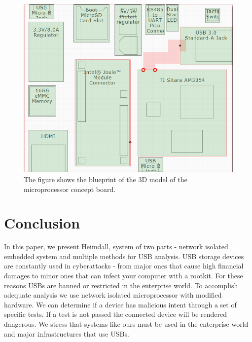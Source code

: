 \documentclass[sigconf]{acmart}
\begin{document}
\begin{figure}[htp]
    \centering
    \includegraphics[width=\linewidth]{images/Screenshot_2D.png}
    \caption{The figure shows the blueprint of the 3D model of the microprocessor concept board.}
    \label{fig:scheme}
\end{figure}

\section{Conclusion}
\quad In this paper, we present Heimdall, system of two parts - network isolated embedded system and multiple methods for USB analysis. USB storage devices are constantly used in cyberattacks - from major ones that cause high financial damages to minor ones that can infect your computer with a rootkit. For these reasons USBs are banned or restricted in the enterprise world. To accomplish adequate analysis we use network isolated microprocessor with modified hardware. We can determine if a device has malicious intent through a set of specific tests. If a test is not passed the connected device will be rendered dangerous. We stress that systems like ours must be used in the enterprise world and major infrastructures that use USBs.



\end{document}
